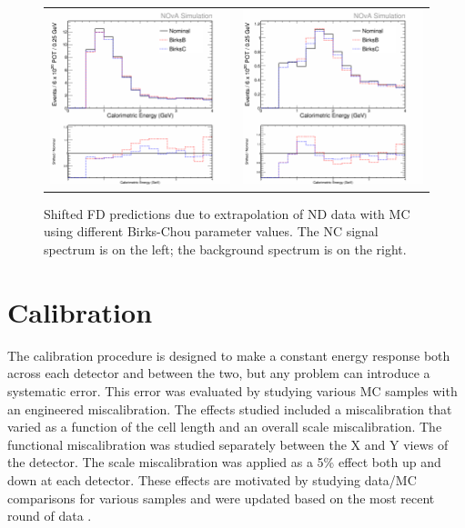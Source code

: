 \begin{figure}[htb]
  \centering
  \begin{tabular}{c c}
    \includegraphics[width=.47\textwidth]{figures/Systs/cNCEXBirksSysts.png} &
    \includegraphics[width=.47\textwidth]{figures/Systs/cBGEXBirksSysts.png} \\
  \end{tabular}
  \caption[Birks-Chou Shifted FD Predictions]{Shifted FD predictions due to extrapolation of ND data with MC using different Birks-Chou parameter values. The NC signal spectrum is on the left; the background spectrum is on the right.}
  \label{fig:SystBirks}
\end{figure}

\section{Calibration}

The calibration procedure is designed to make a constant energy response both across each detector and between the two, but any problem can introduce a systematic error. This error was evaluated by studying various MC samples with an engineered miscalibration. The effects studied included a miscalibration that varied as a function of the cell length and an overall scale miscalibration. The functional miscalibration was studied separately between the X and Y views of the detector. The scale miscalibration was applied as a 5\% effect both up and down at each detector. These effects are motivated by studying data/MC comparisons for various samples \cite{ref:TNCalib, ref:CalibMESA, ref:CalibPi0SA} and were updated based on the most recent round of data \cite{ref:CalibSA}.

